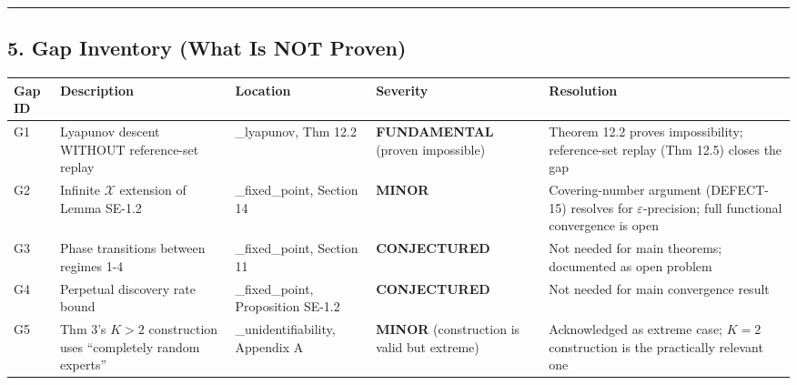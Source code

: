 \documentclass[
  12pt,
]{ctexart}
\begin{document}
\begin{center}\rule{0.5\linewidth}{0.5pt}\end{center}

\subsection{5. Gap Inventory (What Is NOT
Proven)}\label{gap-inventory-what-is-not-proven}

\begin{longtable}[]{@{}
  >{\raggedright\arraybackslash}p{}
  >{\raggedright\arraybackslash}p{}
  >{\raggedright\arraybackslash}p{}
  >{\raggedright\arraybackslash}p{}
  >{\raggedright\arraybackslash}p{}@{}}
\toprule\noalign{}
\begin{minipage}[b]{\linewidth}\raggedright
Gap ID
\end{minipage} & \begin{minipage}[b]{\linewidth}\raggedright
Description
\end{minipage} & \begin{minipage}[b]{\linewidth}\raggedright
Location
\end{minipage} & \begin{minipage}[b]{\linewidth}\raggedright
Severity
\end{minipage} & \begin{minipage}[b]{\linewidth}\raggedright
Resolution
\end{minipage} \\
\midrule\noalign{}
\endhead
\bottomrule\noalign{}
\endlastfoot
G1 & Lyapunov descent WITHOUT reference-set replay & 10\_lyapunov, Thm
12.2 & \textbf{FUNDAMENTAL} (proven impossible) & Theorem 12.2 proves
impossibility; reference-set replay (Thm 12.5) closes the gap \\
G2 & Infinite \(\mathcal{X}\) extension of Lemma SE-1.2 &
06\_fixed\_point, Section 14 & \textbf{MINOR} & Covering-number argument
(DEFECT-15) resolves for \(\varepsilon\)-precision; full functional
convergence is open \\
G3 & Phase transitions between regimes 1-4 & 06\_fixed\_point, Section
11 & \textbf{CONJECTURED} & Not needed for main theorems; documented as
open problem \\
G4 & Perpetual discovery rate bound & 06\_fixed\_point, Proposition
SE-1.2 & \textbf{CONJECTURED} & Not needed for main convergence
result \\
G5 & Thm 3's \(K>2\) construction uses ``completely random experts'' &
03\_unidentifiability, Appendix A & \textbf{MINOR} (construction is
valid but extreme) & Acknowledged as extreme case; \(K=2\) construction
is the practically relevant one \\
\end{longtable}
\end{document}
